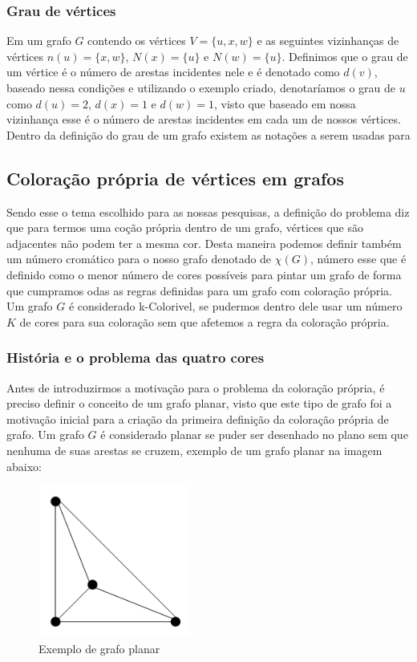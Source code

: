 \documentclass[12pt]{article}
\begin{document}
	\subsubsection{Grau de vértices}
	Em um grafo $G$ contendo os vértices $V = \{u, x, w\}$ e as seguintes vizinhanças de vértices $n(u) = \{x, w\}$, $N(x) = \{u\}$ e $N(w) = \{u\}$.	
	Definimos que o grau de um vértice é o número de arestas incidentes nele e é denotado como $d(v)$, baseado nessa condições e utilizando o exemplo criado, denotaríamos o grau de $u$ como $d(u) = 2$, $d(x) = 1$ e $d(w) = 1$, visto que baseado em nossa vizinhança esse é o número de arestas incidentes em cada um de nossos vértices.
	Dentro da definição do grau de um grafo existem as notações a serem usadas para 
	
	\subsection{ Coloração própria de vértices em grafos}
	Sendo esse o tema escolhido para as nossas pesquisas, a definição do problema diz que para termos uma coção própria dentro de um grafo, vértices que são adjacentes não podem ter a mesma cor. Desta maneira podemos definir também um número cromático para o nosso grafo denotado de $\chi(G)$, número esse que é definido como o menor número de cores possíveis para pintar um grafo de forma que cumpramos odas as regras definidas para um grafo com coloração própria.
	Um grafo $G$ é considerado k-Colorivel, se pudermos dentro dele usar um número $K$ de cores para sua coloração sem que afetemos a regra da coloração própria.
	
	\subsubsection{História e o problema das quatro cores}
	
	Antes de introduzirmos a motivação para o problema da coloração própria, é preciso definir o conceito de um grafo planar, visto que este tipo de grafo foi a motivação inicial para a criação da primeira definição da coloração própria de grafo.
	Um grafo $G$ é considerado planar se puder ser desenhado no plano sem que nenhuma de suas arestas se cruzem, exemplo de um grafo planar na imagem abaixo:
		
		
	\begin{figure}[!htb]
		\centering
		\includegraphics[width=5cm, height=5cm]{grafoPlanar}
		\caption{Exemplo de grafo planar}    
	\end{figure}
	
\end{document}
